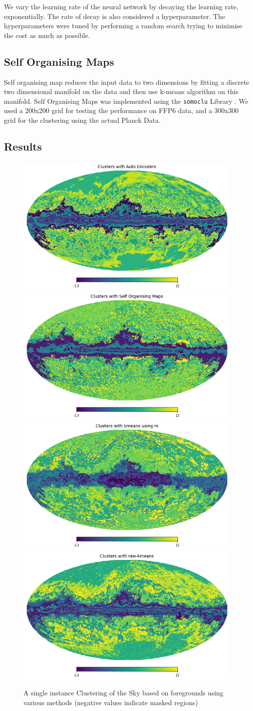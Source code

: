We vary the learning rate of the neural network by decaying the learning rate, exponentially. The rate of decay is also
considered a hyperparameter. The hyperparameters were tuned by performing a random search trying to minimise the cost as much as
possible.

\subsection{Self Organising Maps}
Self organising map reduces the input data to two dimensions by fitting a discrete two dimensional
manifold on the data and then use k-means algorithm on this manifold.
Self Organising Maps was implemented using the \texttt{somoclu} Library \cite{somoclu}.
We used a 200x200 grid for testing the performance on FFP6 data, and a 300x300 grid for the clustering using the actual Planck Data.

\subsection{Results}
\begin{figure}[H]
  \centering
  \includegraphics[width=0.35\linewidth]{auto_clusters.png}
  \includegraphics[width=0.35\linewidth]{som_clusters.png}
  \includegraphics[width=0.35\linewidth]{kmeans_clusters.png}
  \includegraphics[width=0.35\linewidth]{raw_kmeans_clusters.png}
  \caption{A single instance Clustering of the Sky based on foregrounds using various methods (negative values indicate masked regions)}
\end{figure}



